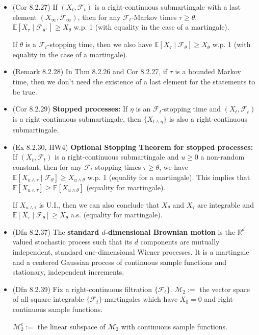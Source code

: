 \documentclass[twoside]{article}
\newcommand\bbE{\mathbb{E}}
\newcommand\bbR{\mathbb{R}}
\newcommand\calF{\mathcal{F}}
\newcommand\calM{\mathcal{M}}
\def\t{\theta}
\begin{document}
\begin{itemize}
\item (Cor 8.2.27) If $(X_t, \calF_t)$ is a right-continuous submartingale with a last element $(X_\infty, \calF_\infty)$, then for any $\calF_t$-Markov times $\tau \geq \t$, $\bbE [X_\tau \mid \calF_{\t^+}] \geq X_\t$ w.p. 1 (with equality in the case of a martingale).

If $\t$ is a $\calF_t$-stopping time, then we also have $\bbE [X_\tau \mid \calF_\t] \geq X_\t$ w.p. 1 (with equality in the case of a martingale).

\item (Remark 8.2.28) In Thm 8.2.26 and Cor 8.2.27, if $\tau$ is a bounded Markov time, then we don't need the existence of a last element for the statements to be true.

\item (Cor 8.2.29) \textbf{Stopped processes:} If $\eta$ is an $\calF_t$-stopping time and $(X_t, \calF_t)$ is a right-continuous submartingale, then $\{ X_{t \wedge \eta}\}$ is also a right-continuous submartingale.

\item (Ex 8.2.30, HW4) \textbf{Optional Stopping Theorem for stopped processes:} If $(X_t, \calF_t)$ is a right-continuous submartingale and $u \geq 0$ a non-random constant, then for any $\calF_t$-stopping times $\tau \geq \t$, we have $\bbE [X_{u \wedge \tau} \mid \calF_\t] \geq X_{u \wedge \t}$ w.p. 1 (equality for a martingale). This implies that $\bbE [X_{u \wedge \tau}] \geq \bbE [X_{u \wedge \t}]$ (equality for martingale).

If $X_{u \wedge \tau}$ is U.I., then we can also conclude that $X_\t$ and $X_\tau$ are integrable and $\bbE [X_\tau \mid \calF_\t] \geq X_\t$ a.s. (equality for martingale).

\item (Dfn 8.2.37) The \textbf{standard $d$-dimensional Brownian motion} is the $\bbR^d$-valued stochastic process such that its $d$ components are mutually independent, standard one-dimensional Wiener processes. It is a martingale and a centered Gaussian process of continuous sample functions and stationary, independent increments.

\item (Dfn 8.2.39) Fix a right-continuous filtration $\{\calF_t\}$. $\calM_2 :=$ the vector space of all square integrable $\{\calF_t\}$-martingales which have $X_0 = 0$ and right-continuous sample functions.

$\calM_2^c :=$ the linear subspace of $\calM_2$ with continuous sample functions.


\end{itemize}
\end{document}
